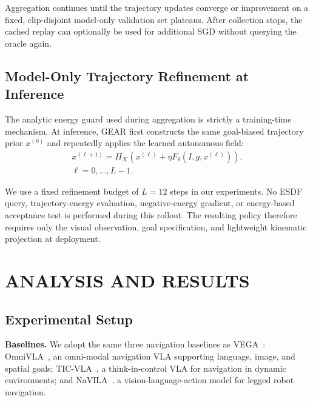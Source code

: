 \documentclass[letterpaper, 10 pt, conference]{ieeeconf}  %
\begin{document}
Aggregation continues until the trajectory updates converge or improvement
on a fixed, clip-disjoint model-only validation set plateaus. After collection
stops, the cached replay can optionally be used for additional SGD without
querying the oracle again.

\subsection{Model-Only Trajectory Refinement at Inference}
\label{sec:inference}

The analytic energy guard used during aggregation is strictly a
training-time mechanism. At inference, GEAR first constructs the same
goal-biased trajectory prior $x^{(0)}$ and repeatedly applies the learned
autonomous field:
\[
    \begin{gathered}
    x^{(\ell+1)}
    =
    \Pi_{\mathcal K}
    \left(
        x^{(\ell)}
        +
        \eta
        F_\theta(I,g,x^{(\ell)})
    \right),\\
    \ell=0,\ldots,L-1.
    \end{gathered}
\]

We use a fixed refinement budget of $L=12$ steps in our experiments.
No ESDF query, trajectory-energy evaluation, negative-energy gradient, or
energy-based acceptance test is performed during this rollout. The resulting
policy therefore requires only the visual observation, goal specification,
and lightweight kinematic projection at deployment.


\section{ANALYSIS AND RESULTS}

\label{sec:results}

\subsection{Experimental Setup}
\label{sec:experimental_setup}

\textbf{Baselines.}
We adopt the same three navigation baselines as VEGA~\cite{vega}:
OmniVLA~\cite{omnivla}, an omni-modal navigation VLA supporting language,
image, and spatial goals; TIC-VLA~\cite{ticvla}, a think-in-control VLA for
navigation in dynamic environments; and NaVILA~\cite{navila}, a
vision-language-action model for legged robot navigation.
\end{document}
